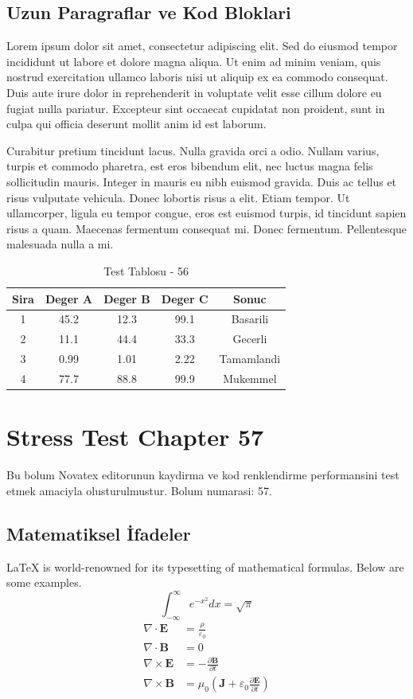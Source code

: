 \documentclass[12pt,a4paper]{article}
\begin{document}
\subsection{Uzun Paragraflar ve Kod Bloklari}
Lorem ipsum dolor sit amet, consectetur adipiscing elit. Sed do eiusmod tempor incididunt ut labore et dolore magna aliqua. Ut enim ad minim veniam, quis nostrud exercitation ullamco laboris nisi ut aliquip ex ea commodo consequat. Duis aute irure dolor in reprehenderit in voluptate velit esse cillum dolore eu fugiat nulla pariatur. Excepteur sint occaecat cupidatat non proident, sunt in culpa qui officia deserunt mollit anim id est laborum.

Curabitur pretium tincidunt lacus. Nulla gravida orci a odio. Nullam varius, turpis et commodo pharetra, est eros bibendum elit, nec luctus magna felis sollicitudin mauris. Integer in mauris eu nibh euismod gravida. Duis ac tellus et risus vulputate vehicula. Donec lobortis risus a elit. Etiam tempor. Ut ullamcorper, ligula eu tempor congue, eros est euismod turpis, id tincidunt sapien risus a quam. Maecenas fermentum consequat mi. Donec fermentum. Pellentesque malesuada nulla a mi.

\begin{table}[h!]
\centering
\begin{tabular}{|c|c|c|c|c|}
\hline
\textbf{Sira} & \textbf{Deger A} & \textbf{Deger B} & \textbf{Deger C} & \textbf{Sonuc} \\
\hline
1 & 45.2 & 12.3 & 99.1 & Basarili \\
2 & 11.1 & 44.4 & 33.3 & Gecerli \\
3 & 0.99 & 1.01 & 2.22 & Tamamlandi \\
4 & 77.7 & 88.8 & 99.9 & Mukemmel \\
\hline
\end{tabular}
\caption{Test Tablosu - 56}
\end{table}

\newpage
\section{Stress Test Chapter 57}
Bu bolum Novatex editorunun kaydirma ve kod renklendirme performansini test etmek amaciyla olusturulmustur. Bolum numarasi: 57.

\subsection{Matematiksel İfadeler}
\LaTeX{} is world-renowned for its typesetting of mathematical formulas. Below are some examples.
\begin{equation}
\int_{-\infty}^{\infty} e^{-x^2} dx = \sqrt{\pi}
\end{equation}
\begin{align}
\nabla \cdot \mathbf{E} &= \frac{\rho}{\varepsilon_0} \\
\nabla \cdot \mathbf{B} &= 0 \\
\nabla \times \mathbf{E} &= -\frac{\partial \mathbf{B}}{\partial t} \\
\nabla \times \mathbf{B} &= \mu_0\left(\mathbf{J} + \varepsilon_0 \frac{\partial \mathbf{E}}{\partial t}\right)
\end{align}
\end{document}
